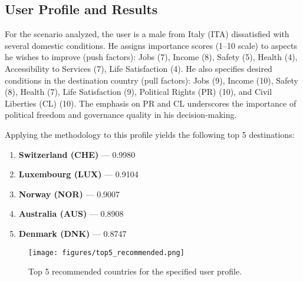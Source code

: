 \documentclass[11pt]{article}
\begin{document}
\subsection{User Profile and Results}

\noindent
For the scenario analyzed, the user is a male from Italy (ITA) dissatisfied with several domestic conditions. He assigns importance scores (1–10 scale) to aspects he wishes to improve (push factors): Jobs (7), Income (8), Safety (5), Health (4), Accessibility to Services (7), Life Satisfaction (4). He also specifies desired conditions in the destination country (pull factors): Jobs (9), Income (10), Safety (8), Health (7), Life Satisfaction (9), Political Rights (PR) (10), and Civil Liberties (CL) (10). The emphasis on PR and CL underscores the importance of political freedom and governance quality in his decision-making.

\medskip
\noindent
Applying the methodology to this profile yields the following top 5 destinations:

\begin{enumerate}
    \item \textbf{Switzerland (CHE)} — 0.9980
    \item \textbf{Luxembourg (LUX)} — 0.9104
    \item \textbf{Norway (NOR)} — 0.9007
    \item \textbf{Australia (AUS)} — 0.8908
    \item \textbf{Denmark (DNK)} — 0.8747
\end{enumerate}

\begin{figure}[H]
    \centering
    \texttt{[image: figures/top5\_recommended.png]}
    \caption{Top 5 recommended countries for the specified user profile.}
    \label{fig:top5}
\end{figure}
\end{document}
